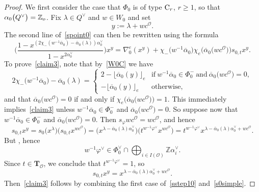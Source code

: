\begin{proof}
We first consider the case that $\Phi_0$ is of type ${\rm C}_r$, $r\geq 1$, so that $\alpha_0\smash{\bigl(Q^\vee\bigr)}=\mathbb{Z}_o$.
Fix $\lambda\in Q^\vee$ and $w\in W_0$ and set
\[
y:=\lambda+wc^\mathcal{O}.
\]
The second line of~\eqref{spoint0} can then be rewritten using the formula
\begin{equation}\label{claim3}
\Biggl(\frac{1-x^{(2\chi_-(w^{-1}\overline{\alpha}_0)-\overline{\alpha}_0(\lambda))\alpha_0^\vee}}{1-x^{2\alpha_0^\vee}}\Biggr)x^{y}=
\nabla_0^e(x^y)
+\chi_-\bigl(w^{-1}\overline{\alpha}_0\bigr)\chi_e\bigl(\overline{\alpha}_0\bigl(wc^\mathcal{O}\bigr)\bigr)s_{0,t}x^{y}.
\end{equation}
To prove~\eqref{claim3}, note that by~\eqref{W0C} we have
\begin{equation}
\label{sstep10}
2\chi_-\bigl(w^{-1}\overline{\alpha}_0\bigr)-\overline{\alpha}_0(\lambda)=
\begin{cases}
2-\lfloor\overline{\alpha}_0(y)\rfloor_e &\text{if}\ w^{-1}\overline{\alpha}_0\in\Phi_0^-\ \text{and}\ \overline{\alpha}_0\bigl(wc^\mathcal{O}\bigr)=0,\\
-\lfloor\overline{\alpha}_0(y)\rfloor_e &\text{otherwise},
\end{cases}
\end{equation}
and that $\overline{\alpha}_0\bigl(wc^\mathcal{O}\bigr)=0$ if and only if $\chi_e\bigl(\overline{\alpha}_0\bigl(wc^\mathcal{O}\bigr)\bigr)=1$.
This immediately implies~\eqref{claim3} unless
$w^{-1}\overline{\alpha}_0\in\Phi_0^-$ and $\overline{\alpha}_0\bigl(wc^\mathcal{O}\bigr)=0$.
So suppose now that $w^{-1}\overline{\alpha}_0\in\Phi_0^-$ and $\overline{\alpha}_0\bigl(wc^\mathcal{O}\bigr)=0$. Then $s_\varphi wc^\mathcal{O}=wc^\mathcal{O}$, and hence
\[
s_{0,t}x^y=s_0\bigl(x^\lambda\bigr)\bigl(s_{0,t}x^{wc^\mathcal{O}}\bigr)=\bigl(x^{\lambda-\overline{\alpha}_0(\lambda)\alpha_0^\vee}\bigr)\bigl(t^{w^{-1}\varphi^\vee}x^{wc^\mathcal{O}}\bigr)
=t^{w^{-1}\varphi^\vee}x^{\lambda-\overline{\alpha}_0(\lambda)\alpha_0^\vee+wc^\mathcal{O}}.
\]
But , hence
\[
w^{-1}\varphi^\vee\in\Phi_0^\vee\cap\bigoplus_{i\in I(\mathcal{O})}\mathbb{Z}\alpha_i^\vee.
\]
 Since $t\in\mathbf{T}_\mathcal{O}$,
we conclude that ${t^{w^{-1}\varphi^\vee}=1}$, so
\begin{equation}\label{s0simple}
s_{0,t}x^y=x^{\lambda-\overline{\alpha}_0(\lambda)\alpha_0^\vee+wc^\mathcal{O}}.
\end{equation}
Then~\eqref{claim3} follows by combining the first case of~\eqref{sstep10} and~\eqref{s0simple}.


\end{proof}
